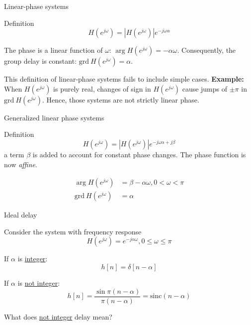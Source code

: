 \documentclass[10pt, aspectratio=169]{beamer}
\begin{document}
%
\begin{frame}{Linear-phase systems}
\begin{block}{Definition}
	\begin{equation*}
	H(e^{j\omega}) = |H(e^{j\omega})|e^{-j\omega\alpha}
	\end{equation*} 
\end{block}

The phase is a linear function of $\omega$: $\arg H(e^{j\omega}) = -\alpha\omega$. Consequently, the group delay is constant: $\mathrm{grd}~H(e^{j\omega}) = \alpha$.

\vspace{2mm}

This definition of linear-phase systems fails to include simple cases. \textbf{Example:} When  $H(e^{j\omega})$ is purely real, changes of sign in $H(e^{j\omega})$ cause jumps of $\pm\pi$ in $\mathrm{grd}~H(e^{j\omega})$. Hence, those systems are not strictly linear phase.

\end{frame}

\begin{frame}{Generalized linear phase systems}
\begin{block}{Definition}
	\begin{equation*}
	H(e^{j\omega}) = |H(e^{j\omega})|e^{-j\omega\alpha + j\beta}
	\end{equation*} 
	a term $\beta$ is added to account for constant phase changes. The phase function is now \textit{affine}.
\end{block}

\begin{align*}
\arg H(e^{j\omega}) &= \beta - \alpha\omega, 0 < \omega < \pi \tag{phase}\\
\mathrm{grd}~H(e^{j\omega}) &= \alpha \tag{group delay}
\end{align*}
\end{frame}

\begin{frame}{Ideal delay}

Consider the system with frequency response
\begin{equation*}
H(e^{j\omega}) = e^{-j\alpha\omega}, 0 \leq \omega \leq \pi \tag{ideal delay}
\end{equation*}

If $\alpha$ is \underline{integer}:
\begin{equation*}
h[n] = \delta[n-\alpha] \tag{from DTFT delay property}
\end{equation*}

If $\alpha$ is \underline{not integer}:
\begin{equation*}
h[n] = \frac{\sin \pi(n-\alpha)}{\pi(n-\alpha)} = \mathrm{sinc}(n-\alpha)
\end{equation*}

What does \underline{not integer} delay mean?

\end{frame}
\end{document}

